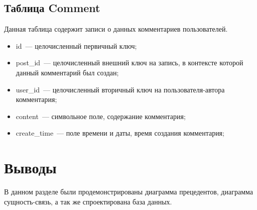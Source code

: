 \subsection{Таблица Comment}%
\label{sub:tablitsa_comment}
Данная таблица содержит записи о данных комментариев пользователей.
\begin{itemize}
    \item id~--- целочисленный первичный ключ;
    \item post\_id~--- целочисленный внешний ключ на запись, в контексте которой данный комментарий был создан;
    \item user\_id~--- целочисленный вторичный ключ на пользователя-автора комментария;
    \item content~--- символьное поле, содержание комментария;
    \item create\_time~--- поле времени и даты, время создания комментария;
\end{itemize}

\section{Выводы}%
\label{sec:vyvody}

В данном разделе были продемонстрированы диаграмма прецедентов, диаграмма сущность-связь, а так же спроектирована база данных.
